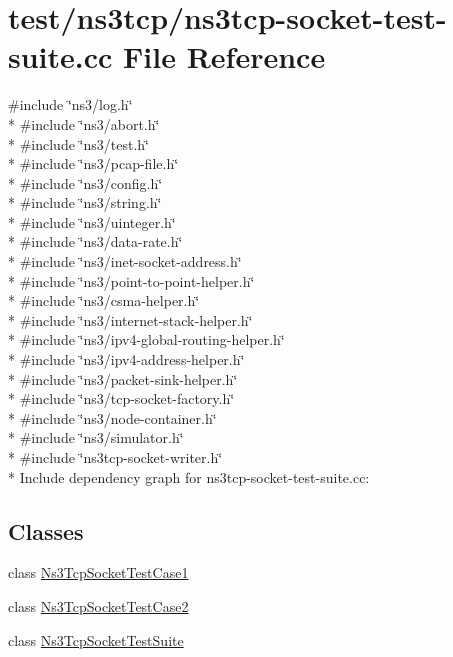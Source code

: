 \hypertarget{ns3tcp-socket-test-suite_8cc}{}\section{test/ns3tcp/ns3tcp-\/socket-\/test-\/suite.cc File Reference}
\label{ns3tcp-socket-test-suite_8cc}
{\ttfamily \#include \char`\"{}ns3/log.\+h\char`\"{}}\\*
{\ttfamily \#include \char`\"{}ns3/abort.\+h\char`\"{}}\\*
{\ttfamily \#include \char`\"{}ns3/test.\+h\char`\"{}}\\*
{\ttfamily \#include \char`\"{}ns3/pcap-\/file.\+h\char`\"{}}\\*
{\ttfamily \#include \char`\"{}ns3/config.\+h\char`\"{}}\\*
{\ttfamily \#include \char`\"{}ns3/string.\+h\char`\"{}}\\*
{\ttfamily \#include \char`\"{}ns3/uinteger.\+h\char`\"{}}\\*
{\ttfamily \#include \char`\"{}ns3/data-\/rate.\+h\char`\"{}}\\*
{\ttfamily \#include \char`\"{}ns3/inet-\/socket-\/address.\+h\char`\"{}}\\*
{\ttfamily \#include \char`\"{}ns3/point-\/to-\/point-\/helper.\+h\char`\"{}}\\*
{\ttfamily \#include \char`\"{}ns3/csma-\/helper.\+h\char`\"{}}\\*
{\ttfamily \#include \char`\"{}ns3/internet-\/stack-\/helper.\+h\char`\"{}}\\*
{\ttfamily \#include \char`\"{}ns3/ipv4-\/global-\/routing-\/helper.\+h\char`\"{}}\\*
{\ttfamily \#include \char`\"{}ns3/ipv4-\/address-\/helper.\+h\char`\"{}}\\*
{\ttfamily \#include \char`\"{}ns3/packet-\/sink-\/helper.\+h\char`\"{}}\\*
{\ttfamily \#include \char`\"{}ns3/tcp-\/socket-\/factory.\+h\char`\"{}}\\*
{\ttfamily \#include \char`\"{}ns3/node-\/container.\+h\char`\"{}}\\*
{\ttfamily \#include \char`\"{}ns3/simulator.\+h\char`\"{}}\\*
{\ttfamily \#include \char`\"{}ns3tcp-\/socket-\/writer.\+h\char`\"{}}\\*
Include dependency graph for ns3tcp-\/socket-\/test-\/suite.cc\+:
\subsection*{Classes}
\begin{DoxyCompactItemize}
\item 
class \hyperlink{classNs3TcpSocketTestCase1}{Ns3\+Tcp\+Socket\+Test\+Case1}
\item 
class \hyperlink{classNs3TcpSocketTestCase2}{Ns3\+Tcp\+Socket\+Test\+Case2}
\item 
class \hyperlink{classNs3TcpSocketTestSuite}{Ns3\+Tcp\+Socket\+Test\+Suite}
\end{DoxyCompactItemize}
